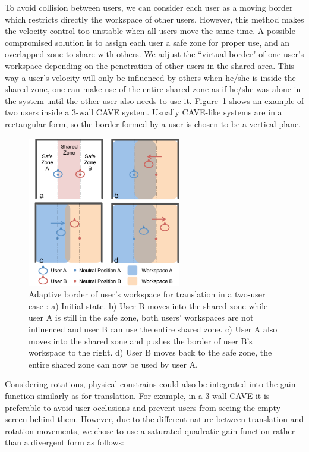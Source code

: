 To avoid collision between users, we can consider each user as a moving border which restricts directly the workspace of other users. However, this method makes the velocity control too unstable when all users move the same time. A possible compromised solution is to assign each user a safe zone for proper use, and an overlapped zone to share with others. We adjust the ``virtual border" of one user's workspace depending on the penetration of other users in the shared area. This way a user's velocity will only be influenced by others when he/she is inside the shared zone, one can make use of the entire shared zone as if he/she was alone in the system until the other user also needs to use it. Figure~\ref{fig:3_adaptive_trans_border} shows an example of two users inside a 3-wall CAVE system. Usually CAVE-like systems are in a rectangular form, so the border formed by a user is chosen to be a vertical plane.

\begin{figure}[tb]
\begin{center}
\includegraphics[width=0.6\textwidth]{figures/3_adaptive_trans_border}
\end{center}
\caption{\label{fig:3_adaptive_trans_border}Adaptive border of user's workspace for translation in a two-user case : a) Initial state. b) User B moves into the shared zone while user A is still in the safe zone, both users' workspaces are not influenced and user B can use the entire shared zone. c) User A also moves into the shared zone and pushes the border of user B's workspace to the right. d) User B moves back to the safe zone, the entire shared zone can now be used by user A.}
\end{figure}

Considering rotations, physical constrains could also be integrated into the gain function similarly as for translation. For example, in a 3-wall CAVE it is preferable to avoid user occlusions and prevent users from seeing the empty screen behind them. However, due to the different nature between translation and rotation movements, we chose to use a saturated quadratic gain function rather than a divergent form as follows:

